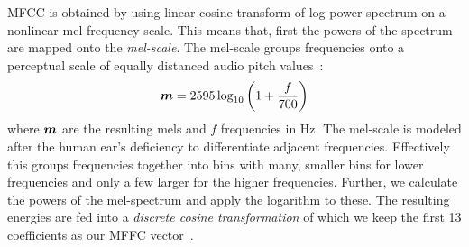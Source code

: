 MFCC is obtained by using linear cosine transform of log power spectrum on a nonlinear mel-frequency scale. This means that, first the powers of the spectrum are mapped onto the \emph{mel-scale}. The mel-scale groups frequencies onto a perceptual scale of equally distanced audio pitch values~\cite{stevens1937scale}: 
$$
\boldsymbol{m} = 2595 \log_{10}\left(1+{\frac {f}{700}}\right)
$$
where $\boldsymbol{m}$ are the resulting mels and $f$ frequencies in Hz. The mel-scale is modeled after the human ear's deficiency to differentiate adjacent frequencies. Effectively this groups frequencies together into bins with many, smaller bins for lower frequencies and only a few larger for the higher frequencies. Further, we calculate the powers of the mel-spectrum and apply the logarithm to these. The resulting energies are fed into a \emph{discrete cosine transformation} of which we keep the first 13 coefficients as our MFFC vector~\cite{sahidullah2012design}. 
